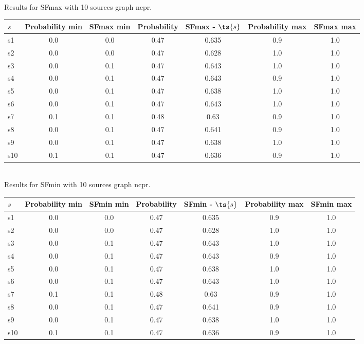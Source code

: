 \documentclass{article}
\begin{document}
\noindent Results for SFmax with 10 sources graph ncpr.

\noindent\begin{tabular}{|l|c|c|c|c|c|c|}
\hline
$s$& Probability min & SFmax min & Probability & SFmax - $\ts{s}$ & Probability max & SFmax max\\
\hline
s1 &0.0 & 0.0 & 0.47 & 0.635 & 0.9 & 1.0\\
\hline
s2 &0.0 & 0.0 & 0.47 & 0.628 & 1.0 & 1.0\\
\hline
s3 &0.0 & 0.1 & 0.47 & 0.643 & 1.0 & 1.0\\
\hline
s4 &0.0 & 0.1 & 0.47 & 0.643 & 0.9 & 1.0\\
\hline
s5 &0.0 & 0.1 & 0.47 & 0.638 & 1.0 & 1.0\\
\hline
s6 &0.0 & 0.1 & 0.47 & 0.643 & 1.0 & 1.0\\
\hline
s7 &0.1 & 0.1 & 0.48 & 0.63 & 0.9 & 1.0\\
\hline
s8 &0.0 & 0.1 & 0.47 & 0.641 & 0.9 & 1.0\\
\hline
s9 &0.0 & 0.1 & 0.47 & 0.638 & 1.0 & 1.0\\
\hline
s10 &0.1 & 0.1 & 0.47 & 0.636 & 0.9 & 1.0\\
\hline
\end{tabular}\\

\noindent Results for SFmin with 10 sources graph ncpr.

\noindent\begin{tabular}{|l|c|c|c|c|c|c|}
\hline
$s$& Probability min & SFmin min & Probability & SFmin - $\ts{s}$ & Probability max & SFmin max\\
\hline
s1 &0.0 & 0.0 & 0.47 & 0.635 & 0.9 & 1.0\\
\hline
s2 &0.0 & 0.0 & 0.47 & 0.628 & 1.0 & 1.0\\
\hline
s3 &0.0 & 0.1 & 0.47 & 0.643 & 1.0 & 1.0\\
\hline
s4 &0.0 & 0.1 & 0.47 & 0.643 & 0.9 & 1.0\\
\hline
s5 &0.0 & 0.1 & 0.47 & 0.638 & 1.0 & 1.0\\
\hline
s6 &0.0 & 0.1 & 0.47 & 0.643 & 1.0 & 1.0\\
\hline
s7 &0.1 & 0.1 & 0.48 & 0.63 & 0.9 & 1.0\\
\hline
s8 &0.0 & 0.1 & 0.47 & 0.641 & 0.9 & 1.0\\
\hline
s9 &0.0 & 0.1 & 0.47 & 0.638 & 1.0 & 1.0\\
\hline
s10 &0.1 & 0.1 & 0.47 & 0.636 & 0.9 & 1.0\\
\hline
\end{tabular}\\
\end{document}
